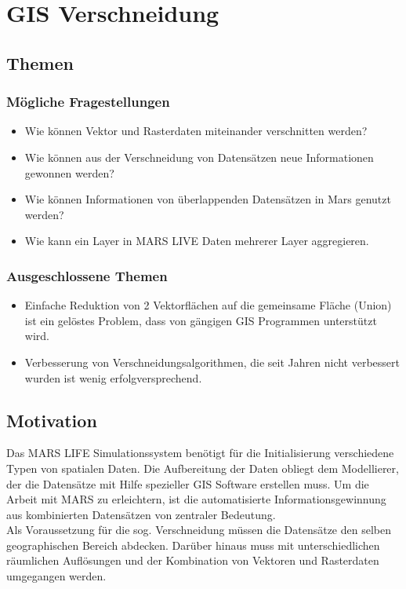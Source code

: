 
\chapter{GIS Verschneidung}


\section{Themen}

\subsection{Mögliche Fragestellungen}
\begin{itemize}
	\item Wie können Vektor und Rasterdaten miteinander verschnitten werden?
	\item Wie können aus der Verschneidung von Datensätzen neue Informationen gewonnen werden?
	\item Wie können Informationen von überlappenden Datensätzen in Mars genutzt werden?
	\item Wie kann ein Layer in MARS LIVE Daten mehrerer Layer aggregieren.
\end{itemize}


\subsection{Ausgeschlossene Themen}
\begin{itemize}
	\item Einfache Reduktion von 2 Vektorflächen auf die gemeinsame Fläche (Union) ist ein gelöstes Problem, dass von gängigen GIS Programmen unterstützt wird.
	\item Verbesserung von Verschneidungsalgorithmen, die seit Jahren nicht verbessert wurden ist wenig erfolgversprechend.
\end{itemize}



\section{Motivation}
Das MARS LIFE Simulationssystem benötigt für die Initialisierung verschiedene Typen von spatialen Daten. Die Aufbereitung der Daten obliegt dem Modellierer, der die Datensätze mit Hilfe spezieller GIS Software erstellen muss. Um die Arbeit mit MARS zu erleichtern, ist die automatisierte Informationsgewinnung aus kombinierten Datensätzen von zentraler Bedeutung.\\
Als Voraussetzung für die sog. Verschneidung müssen die Datensätze den selben geographischen Bereich abdecken. Darüber hinaus muss mit unterschiedlichen räumlichen Auflösungen und der Kombination von Vektoren und Rasterdaten umgegangen werden.


